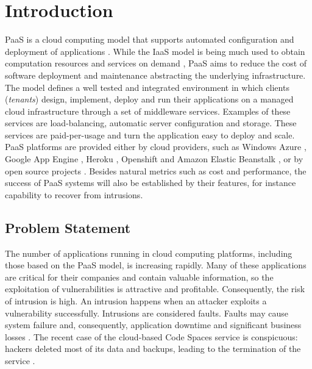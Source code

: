 \chapter{Introduction}\label{chapter:introduction}
\ac{PaaS} is a cloud computing model that supports automated configuration and deployment of applications \cite{Vaquero2008,Vaquero2011,Armbrust,Mell}. While the \ac{IaaS} model is being much used to obtain computation resources and services on demand \cite{Lenk2009,Armbrust2009}, \ac{PaaS} aims to reduce the cost of software deployment and maintenance abstracting the underlying infrastructure. The model defines a well tested and integrated environment in which clients (\textit{tenants}) design, implement, deploy and run their applications on a managed cloud infrastructure through a set of middleware services. Examples of these services are load-balancing, automatic server configuration and storage. These services are paid-per-usage and turn the application easy to deploy and scale.
\ac{PaaS} platforms are provided either by cloud providers, such as Windows Azure \cite{azure}, Google App Engine \cite{GoogleAppEngine}, Heroku \cite{Heroku}, Openshift \cite{OpenShift} and Amazon Elastic Beanstalk \cite{AmazonElasticBeanstalk}, or by open source projects \cite{Appscale,Cloudfoundry,ApacheStratos}. Besides natural metrics such as cost and performance, the success of \ac{PaaS} systems will also be established by their features, for instance capability to recover from intrusions.


\section{Problem Statement}\label{sec:introduction:problem}
The number of applications running in cloud computing platforms, including those based on the \ac{PaaS} model, is increasing rapidly. 
Many of these applications are critical for their companies and contain valuable information, so the exploitation of vulnerabilities is attractive and profitable. Consequently, the risk of intrusion is high. An intrusion happens when an attacker exploits a vulnerability successfully. Intrusions are considered faults. Faults may cause system failure and, consequently, application downtime and significant business losses \cite{Patterson2002a}. The recent case of the cloud-based Code Spaces service is conspicuous: hackers deleted most of its data and backups, leading to the termination of the service \cite{McAllister:14}. 

